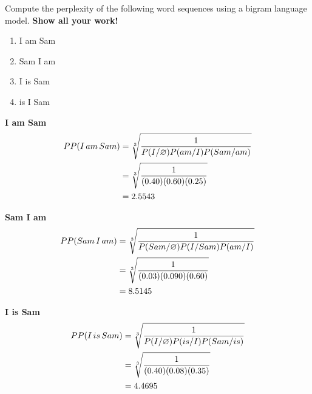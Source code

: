 \documentclass[11pt]{article}
\begin{document}
\begin{enumerate}
Compute the perplexity of the following word sequences using a bigram
language model.  {\bf Show all your work!}
\begin{enumerate}

\item I am Sam

\item Sam I am

\item I is Sam
  
\item is I Sam
  
\end{enumerate}

 \bf I am Sam \\
\begin{equation*}
   \begin{split}
   PP(I  \thinspace am  \thinspace Sam) & = \sqrt[3]{\frac{1}{P(I/\varnothing) P(am/I) P(Sam/am)}} \\ 
                 &  = \sqrt[3]{\frac{1}{(0.40) (0.60) (0.25)}}  \\
                 &= 2.5543 \\
\end{split}
\end{equation*}

\bf Sam I am \\
\begin{equation*}
   \begin{split}
   PP(Sam  \thinspace I  \thinspace am) & = \sqrt[3]{\frac{1}{P(Sam/\varnothing) P(I/Sam) P(am/I)}} \\ 
                 &  = \sqrt[3]{\frac{1}{(0.03) (0.090) (0.60)}}  \\
                 &=8.5145 \\
\end{split}
\end{equation*}

\bf I is Sam \\
\begin{equation*}
   \begin{split}
   PP(I  \thinspace is  \thinspace Sam) & = \sqrt[3]{\frac{1}{P(I/\varnothing) P(is/I) P(Sam/is)}} \\ 
                 &  = \sqrt[3]{\frac{1}{(0.40) (0.08) (0.35)}}  \\
                 &= 4.4695 \\
\end{split}
\end{equation*}



\end{enumerate}
\end{document}
